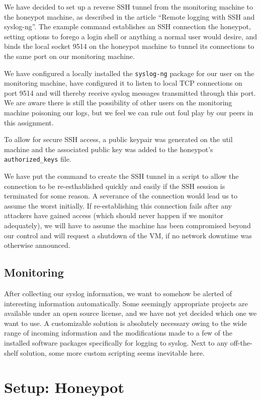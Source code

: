 \documentclass[11pt]{article}
\begin{document}
We have decided to set up a reverse SSH tunnel from the monitoring machine to the honeypot machine, as described in the article ``Remote logging with SSH and syslog-ng''. \cite{remote_logging}
The example command establishes an SSH connection the honeypot, setting options to forego a login shell or anything a normal user would desire, and binds the local socket 9514 on the honeypot machine to tunnel its connections to the same port on our monitoring machine.

We have configured a locally installed the \verb|syslog-ng| package for our user on the monitoring machine, have configured it to listen to local TCP connections on port 9514 and will thereby receive syslog messages transmitted through this port.
We are aware there is still the possibility of other users on the monitoring machine poisoning our logs, but we feel we can rule out foul play by our peers in this assignment.

To allow for secure SSH access, a public keypair was generated on the util machine and the associated public key was added to the honeypot's \verb|authorized_keys| file.

We have put the command to create the SSH tunnel in a script to allow the connection to be re-esthablished quickly and easily if the SSH session is terminated for some reason. 
A severance of the connection would lead us to assume the worst initially.
If re-establishing this connection fails after any attackers have gained access (which should never happen if we monitor adequately), we will have to assume the machine has been compromised beyond our control and will request a shutdown of the VM, if no network downtime was otherwise announced.

\subsection{Monitoring}
After collecting our syslog information, we want to somehow be alerted of interesting information automatically.
Some seemingly appropriate projects are available under an open source license, and we have not yet decided which one we want to use.
A customizable solution is absolutely necessary owing to the wide range of incoming information and the modifications made to a few of the installed software packages specifically for logging to syslog.
Next to any off-the-shelf solution, some more custom scripting seems inevitable here.



\section{Setup: Honeypot}
\end{document}
